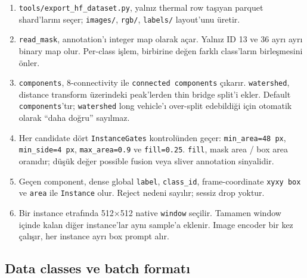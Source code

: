 \begin{enumerate}
  \item \texttt{tools/export\_hf\_dataset.py}, yalnız thermal row taşıyan
        parquet shard'larını seçer; \texttt{images/},
        \texttt{rgb/}, \texttt{labels/} layout'unu üretir.
  \item \texttt{read\_mask}, annotation'ı integer map olarak açar.
        Yalnız ID 13 ve 36 ayrı ayrı binary map olur. Per-class işlem,
        birbirine değen farklı class'ların birleşmesini önler.
  \item \texttt{components}, 8-connectivity ile \texttt{connected
        components} çıkarır. \texttt{watershed}, distance transform
        üzerindeki peak'lerden thin bridge split'i ekler. Default
        \texttt{components}'tır; \texttt{watershed} long vehicle'ı
        over-split edebildiği için otomatik olarak “daha doğru” sayılmaz.
  \item Her candidate dört \texttt{InstanceGates} kontrolünden geçer:
        \texttt{min\_area=48 px}, \texttt{min\_side=4 px},
        \texttt{max\_area=0.9} ve \texttt{fill=0.25}. \texttt{fill},
        mask area / box area oranıdır; düşük değer possible fusion veya
        sliver annotation sinyalidir.
  \item Geçen component, dense global \texttt{label}, \texttt{class\_id},
        frame-coordinate \texttt{xyxy box} ve \texttt{area} ile
        \texttt{Instance} olur. Reject nedeni sayılır; sessiz drop yoktur.
  \item Bir instance etrafında 512×512 native \texttt{window} seçilir.
        Tamamen window içinde kalan diğer instance'lar aynı sample'a eklenir.
        Image encoder bir kez çalışır, her instance ayrı box prompt alır.
\end{enumerate}

\subsection{Data classes ve batch formatı}

